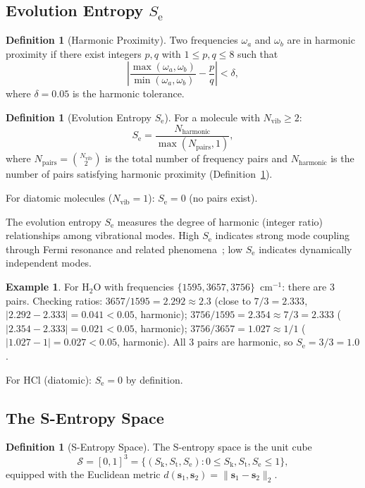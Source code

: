 \documentclass[11pt,twocolumn,a4paper]{article}
\theoremstyle{definition}
\newtheorem{definition}[theorem]{Definition}
\newtheorem{example}[theorem]{Example}
\theoremstyle{remark}
\newcommand{\Sk}{S_{\mathrm{k}}}
\newcommand{\St}{S_{\mathrm{t}}}
\newcommand{\Se}{S_{\mathrm{e}}}
\newcommand{\Sspace}{\mathcal{S}}
\newcommand{\Nvib}{N_{\mathrm{vib}}}
\begin{document}
\subsection{Evolution Entropy $\Se$}
\label{sec:se}

\begin{definition}[Harmonic Proximity]
\label{def:harmonic-proximity}
Two frequencies $\omega_a$ and $\omega_b$ are in harmonic proximity if there exist integers $p, q$ with $1 \leq p, q \leq 8$ such that
\[
  \left| \frac{\max(\omega_a, \omega_b)}{\min(\omega_a, \omega_b)} - \frac{p}{q} \right| < \delta,
\]
where $\delta = 0.05$ is the harmonic tolerance.
\end{definition}

\begin{definition}[Evolution Entropy $\Se$]
\label{def:se}
For a molecule with $\Nvib \geq 2$:
\[
  \Se = \frac{N_{\mathrm{harmonic}}}{\max(N_{\mathrm{pairs}}, 1)},
\]
where $N_{\mathrm{pairs}} = \binom{\Nvib}{2}$ is the total number of frequency pairs and $N_{\mathrm{harmonic}}$ is the number of pairs satisfying harmonic proximity (Definition~\ref{def:harmonic-proximity}).

For diatomic molecules ($\Nvib = 1$): $\Se = 0$ (no pairs exist).
\end{definition}

The evolution entropy $\Se$ measures the degree of harmonic (integer ratio) relationships among vibrational modes. High $\Se$ indicates strong mode coupling through Fermi resonance and related phenomena~\citep{fermi1931}; low $\Se$ indicates dynamically independent modes.

\begin{example}
For H$_2$O with frequencies $\{1595, 3657, 3756\}$~cm$^{-1}$: there are 3 pairs. Checking ratios: $3657/1595 = 2.292 \approx 2.3$ (close to $7/3 = 2.333$, $|2.292 - 2.333| = 0.041 < 0.05$, harmonic); $3756/1595 = 2.354 \approx 7/3 = 2.333$ ($|2.354 - 2.333| = 0.021 < 0.05$, harmonic); $3756/3657 = 1.027 \approx 1/1$ ($|1.027 - 1| = 0.027 < 0.05$, harmonic). All 3 pairs are harmonic, so $\Se = 3/3 = 1.0$.

For HCl (diatomic): $\Se = 0$ by definition.
\end{example}

\subsection{The S-Entropy Space}
\label{sec:sentropy-space}

\begin{definition}[S-Entropy Space]
\label{def:sentropy-space}
The S-entropy space is the unit cube
\[
  \Sspace = [0,1]^3 = \{(\Sk, \St, \Se) : 0 \leq \Sk, \St, \Se \leq 1\},
\]
equipped with the Euclidean metric $d(\mathbf{s}_1, \mathbf{s}_2) = \|\mathbf{s}_1 - \mathbf{s}_2\|_2$.
\end{definition}
\end{document}
